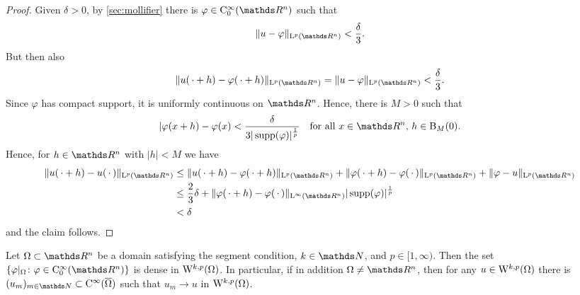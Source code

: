 \begin{proof}
  Given $\delta > 0$, by \ref{sec:mollifier} there is $\varphi \in \CC_0^\infty(\R^n)$ such that
  $$
  \|u - \varphi\|_{\Ell^p(\R^n)} < \frac{\delta}{3}.
  $$
  But then also
  $$
  \|u(\,\cdot + h) - \varphi(\,\cdot + h) \|_{\Ell^p(\R^n)} = \|u - \varphi\|_{\Ell^p(\R^n)} < \frac{\delta}{3}.
  $$
  Since $\varphi$ has compact support, it is uniformly continuous on $\R^n$.
  Hence, there is $M > 0$ such that
  $$
  |\varphi(x + h) - \varphi(x) < \frac{\delta}{3|\supp(\varphi)|^{\frac{1}{p}}} \quad\text{for all } x \in \R^n\text{, } h \in \BB_M(0).
  $$
  Hence, for $h \in \R^n$ with $|h| < M$ we have
  \begin{align*}
    \|u(\,\cdot + h) - u(\,\cdot\,)\|_{\Ell^p(\R^n)}
    &\leq \|u(\,\cdot + h) - \varphi(\,\cdot + h) \|_{\Ell^p(\R^n)} + \|\varphi(\,\cdot + h) - \varphi(\,\cdot\,) \|_{\Ell^p(\R^n)} +  \|\varphi - u \|_{\Ell^p(\R^n)} \\
    &\leq \frac{2}{3}\delta +  \|\varphi(\,\cdot + h) - \varphi(\,\cdot\,)\|_{\Ell^\infty(\R^n)} |\supp(\varphi)|^{\frac{1}{p}} \\
    &< \delta
  \end{align*}
  and the claim follows.
\end{proof}

\setcounter{equation}{3} %

\begin{thm}
  \label{thm:CinftyUpToBoundary}
  Let $\Omega \subset \R^n$ be a domain satisfying the segment condition, $k \in \N$, and $p \in [1,\infty)$.
    Then the set 
    $
    \{ \varphi|_\Omega \colon \varphi \in \CC_0^\infty(\R^n) \}
    $
    is dense in $\mathrm{W}^{k,p}(\Omega)$.
    In particular, if in addition $\Omega \neq \R^n$, then for any $u \in \mathrm{W}^{k,p}(\Omega)$ there is $(u_m)_{m \in \N} \subset \CC^\infty(\overline \Omega)$ such that $u_m \to u$ in $\mathrm{W}^{k,p}(\Omega)$.
\end{thm}

